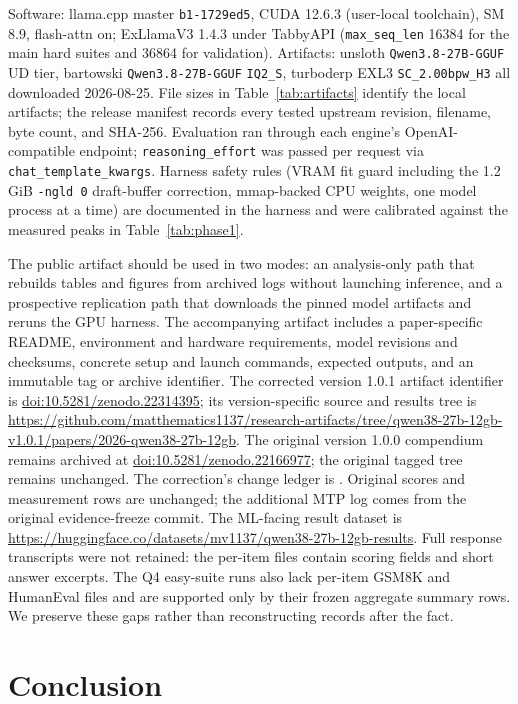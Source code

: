 \documentclass[11pt]{article}
\newcommand{\q}[1]{\texttt{#1}}
\begin{document}
Software: llama.cpp master \q{b1-1729ed5}, CUDA 12.6.3 (user-local
toolchain), SM 8.9, flash-attn on; ExLlamaV3 1.4.3 under TabbyAPI
(\q{max\_seq\_len} 16384 for the main hard suites and 36864 for validation).
Artifacts: unsloth \q{Qwen3.8-27B-GGUF} UD tier,
bartowski \q{Qwen3.8-27B-GGUF} \q{IQ2\_S}, turboderp EXL3 \q{SC\_2.00bpw\_H3}
all downloaded 2026-08-25. File sizes in Table~\ref{tab:artifacts} identify
the local artifacts; the release manifest records every tested upstream
revision, filename, byte count, and SHA-256. Evaluation ran through each
engine's OpenAI-compatible endpoint; \q{reasoning\_effort} was passed per
request via \q{chat\_template\_kwargs}. Harness safety rules (VRAM fit guard
including the 1.2\,GiB \q{-ngld 0} draft-buffer correction, mmap-backed CPU
weights, one model process at a time) are documented in the harness and were
calibrated against the measured peaks in Table~\ref{tab:phase1}.

The public artifact should be used in two modes: an analysis-only path that
rebuilds tables and figures from archived logs without launching inference,
and a prospective replication path that downloads the pinned model artifacts
and reruns the GPU harness. The accompanying artifact includes a paper-specific README,
environment and hardware requirements, model revisions and checksums, concrete
setup and launch commands, expected outputs, and an immutable tag or archive
identifier. The corrected version 1.0.1 artifact identifier is
\href{https://doi.org/10.5281/zenodo.22314395}{doi:10.5281/zenodo.22314395};
its version-specific source and results tree is
\url{https://github.com/matthematics1137/research-artifacts/tree/qwen38-27b-12gb-v1.0.1/papers/2026-qwen38-27b-12gb}.
The original version 1.0.0 compendium remains archived at
\href{https://doi.org/10.5281/zenodo.22166977}{doi:10.5281/zenodo.22166977};
the original tagged tree remains unchanged. The correction's change ledger is
. Original scores and measurement rows are unchanged;
the additional MTP log comes from the original evidence-freeze commit.
The ML-facing result dataset is
\url{https://huggingface.co/datasets/mv1137/qwen38-27b-12gb-results}.
Full response transcripts were not retained: the per-item files contain scoring fields and
short answer excerpts. The Q4 easy-suite runs also lack per-item GSM8K and
HumanEval files and are supported only by their frozen aggregate summary rows.
We preserve these gaps rather than reconstructing records after the fact.


\section{Conclusion}
\end{document}
